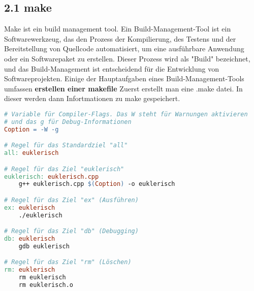 \documentclass[a4paper,11pt,titlepage]{article}
\begin{document}
\subsection{2.1 make}
Make ist ein build management tool. Ein Build-Management-Tool ist ein Softwarewerkzeug,
das den Prozess der Kompilierung, des Testens und der Bereitstellung von Quellcode automatisiert,
um eine ausführbare Anwendung oder ein Softwarepaket zu erstellen. Dieser Prozess wird als "Build"
bezeichnet, und das Build-Management ist entscheidend für die Entwicklung von Softwareprojekten.
Einige der Hauptaufgaben eines Build-Management-Tools umfassen \newline
\textbf{erstellen einer makefile} \newline
Zuerst erstellt man eine .make datei. In dieser werden dann Infortmationen zu make gespeichert. \newline
\pagebreak
\begin{lstlisting}[language=make]
# Variable für Compiler-Flags. Das W steht für Warnungen aktivieren
# und das g für Debug-Informationen
Coption = -W -g

# Regel für das Standardziel "all"
all: euklerisch

# Regel für das Ziel "euklerisch"
euklerisch: euklerisch.cpp
	g++ euklerisch.cpp $(Coption) -o euklerisch

# Regel für das Ziel "ex" (Ausführen)
ex: euklerisch
	./euklerisch

# Regel für das Ziel "db" (Debugging)
db: euklerisch
	gdb euklerisch

# Regel für das Ziel "rm" (Löschen)
rm: euklerisch    
	rm euklerisch
	rm euklerisch.o
\end{lstlisting}
\end{document}
